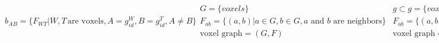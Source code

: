 \begin{subequations}

\begin{equation}
b_{AB}=\{F_{WT} | W, T\, \text{are voxels}, A = g^W_{id}, B = g^T_{id}, A \neq B\}
\label{eq:gbdef}
\end{equation}

\begin{equation}
\begin{aligned}
G=\{voxels\} \\
F_{ab}=\{(a, b) | a \in G, b \in G, a \text{ and } b \text{ are neighbors}\} \\
\text{voxel graph} = (G, F)
\end{aligned}
\label{eq:voxelgraph}
\end{equation}

\begin{equation}
\begin{aligned}
g \subset 
g=\{voxels\} \\
F_{ab}=\{(a, b) | a \in G, b \in G, a \text{ and } b \text{ are neighbors}\} \\
\text{voxel graph} = (G, F)
\end{aligned}
\label{eq:voxelgraph}
\end{equation}

\begin{equation}
\begin{aligned}
V=\{g\} \\
E=\{b_{AB} | A \in V, B \in V\} \\
\text{microstructure graph} = (V, E)
\end{aligned}
\label{eq:micrograph}
\end{equation}

\end{subequations}